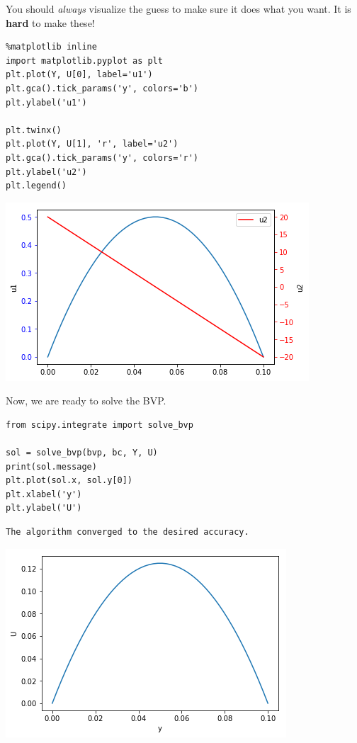 \documentclass[11pt]{article}
\begin{document}
You should \emph{always} visualize the guess to make sure it does what you want. It is \textbf{hard} to make these!

\begin{verbatim}
%matplotlib inline
import matplotlib.pyplot as plt
plt.plot(Y, U[0], label='u1')
plt.gca().tick_params('y', colors='b')
plt.ylabel('u1')

plt.twinx()
plt.plot(Y, U[1], 'r', label='u2')
plt.gca().tick_params('y', colors='r')
plt.ylabel('u2')
plt.legend()
\end{verbatim}

\begin{center}
\includegraphics[width=.9\linewidth]{obipy-resources/9f7f3151fe203e2a10edce4b06f0b33f-90490rG1.png}
\end{center}

Now, we are ready to solve the BVP.

\begin{verbatim}
from scipy.integrate import solve_bvp

sol = solve_bvp(bvp, bc, Y, U)
print(sol.message)
plt.plot(sol.x, sol.y[0])
plt.xlabel('y')
plt.ylabel('U')
\end{verbatim}

\begin{verbatim}
The algorithm converged to the desired accuracy.

\end{verbatim}




\begin{center}
\includegraphics[width=.9\linewidth]{obipy-resources/9f7f3151fe203e2a10edce4b06f0b33f-90490dQE.png}
\end{center}
\end{document}
